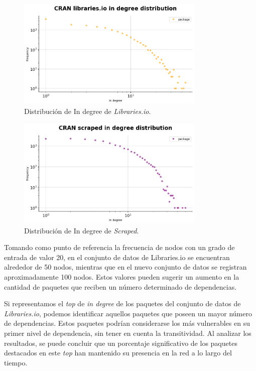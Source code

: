 \begin{figure}[ht!]
    \begin{center}
        \includegraphics[width=0.8\textwidth]{img/cran/ind_lib.png}
        \caption{Distribución de In degree de \textit{Libraries.io}.}
        \label{fig:cran_in_lib}
    \end{center}
\end{figure}

\begin{figure}[ht!]
    \begin{center}
        \includegraphics[width=0.8\textwidth]{img/cran/ind_scr.png}
        \caption{Distribución de In degree de \textit{Scraped}.}
        \label{fig:cran_in_scraped}
    \end{center}
\end{figure}

Tomando como punto de referencia la frecuencia de nodos con un grado de entrada de valor 20,
en el conjunto de datos de Libraries.io se encuentran alrededor de 50 nodos, mientras que en
el nuevo conjunto de datos se registran aproximadamente 100 nodos. Estos valores pueden sugerir
un aumento en la cantidad de paquetes que reciben un número determinado de dependencias.


Si representamos el \textit{top} de \textit{in degree} de los paquetes del conjunto de datos
de \textit{Libraries.io}, podemos identificar aquellos paquetes que poseen un mayor número de
dependencias. Estos paquetes podrían considerarse los más vulnerables en su primer nivel de dependencia,
sin tener en cuenta la transitividad. Al analizar los resultados, se puede concluir que un porcentaje
significativo de los paquetes destacados en este \textit{top} han mantenido su presencia en la red a
lo largo del tiempo.

